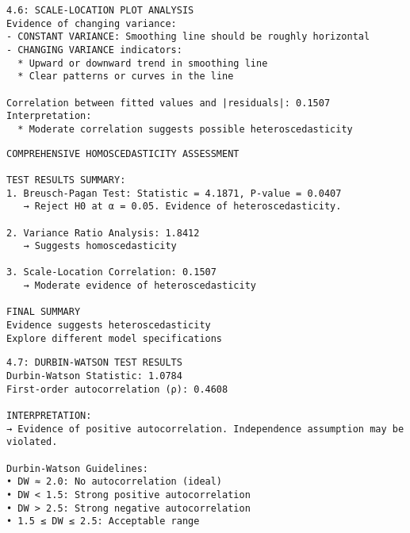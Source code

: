 \documentclass[8pt, twocolumn]{extarticle}
\begin{document}
    \centering
    \begin{Verbatim}[commandchars=\\\{\}]
4.6: SCALE-LOCATION PLOT ANALYSIS
Evidence of changing variance:
- CONSTANT VARIANCE: Smoothing line should be roughly horizontal
- CHANGING VARIANCE indicators:
  * Upward or downward trend in smoothing line
  * Clear patterns or curves in the line

Correlation between fitted values and |residuals|: 0.1507
Interpretation:
  * Moderate correlation suggests possible heteroscedasticity
    \end{Verbatim}

    \centering

    \begin{Verbatim}[commandchars=\\\{\}]
COMPREHENSIVE HOMOSCEDASTICITY ASSESSMENT

TEST RESULTS SUMMARY:
1. Breusch-Pagan Test: Statistic = 4.1871, P-value = 0.0407
   → Reject H0 at α = 0.05. Evidence of heteroscedasticity.

2. Variance Ratio Analysis: 1.8412
   → Suggests homoscedasticity

3. Scale-Location Correlation: 0.1507
   → Moderate evidence of heteroscedasticity

FINAL SUMMARY
Evidence suggests heteroscedasticity
Explore different model specifications
    \end{Verbatim}

    \begin{Verbatim}[commandchars=\\\{\}]
4.7: DURBIN-WATSON TEST RESULTS
Durbin-Watson Statistic: 1.0784
First-order autocorrelation (ρ): 0.4608

INTERPRETATION:
→ Evidence of positive autocorrelation. Independence assumption may be violated.

Durbin-Watson Guidelines:
• DW ≈ 2.0: No autocorrelation (ideal)
• DW < 1.5: Strong positive autocorrelation
• DW > 2.5: Strong negative autocorrelation
• 1.5 ≤ DW ≤ 2.5: Acceptable range

    \end{Verbatim}
\end{document}
